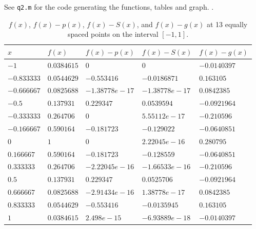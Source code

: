 \documentclass{article}
\begin{document}
\begin{enumerate}
See \texttt{q2.m} for the code generating the functions, tables and graph.
.
\begin{table}
	\centering
	\begin{tabular}{|l|l|l|l|l|}
	\hline
	$x$ & $f(x)$ & $f(x)-p(x)$ & $f(x)-S(x)$ & $f(x)-g(x)$ \\ \hline
	$        -1$ & $ 0.0384615$ & $         0$ & $         0$ & $-0.0140397$ \\
	$ -0.833333$ & $ 0.0544629$ & $ -0.553416$ & $-0.0186871$ & $  0.163105$ \\
	$ -0.666667$ & $ 0.0825688$ & $-1.38778e-17$ & $-1.38778e-17$ & $ 0.0842385$ \\
	$      -0.5$ & $  0.137931$ & $  0.229347$ & $ 0.0539594$ & $-0.0921964$ \\
	$ -0.333333$ & $  0.264706$ & $         0$ & $5.55112e-17$ & $ -0.210596$ \\
	$ -0.166667$ & $  0.590164$ & $ -0.181723$ & $ -0.129022$ & $-0.0640851$ \\
	$         0$ & $         1$ & $         0$ & $2.22045e-16$ & $  0.280795$ \\
	$  0.166667$ & $  0.590164$ & $ -0.181723$ & $ -0.128559$ & $-0.0640851$ \\
	$  0.333333$ & $  0.264706$ & $-2.22045e-16$ & $-1.66533e-16$ & $ -0.210596$ \\
	$       0.5$ & $  0.137931$ & $  0.229347$ & $ 0.0525706$ & $-0.0921964$ \\
	$  0.666667$ & $ 0.0825688$ & $-2.91434e-16$ & $1.38778e-17$ & $ 0.0842385$ \\
	$  0.833333$ & $ 0.0544629$ & $ -0.553416$ & $-0.0135945$ & $  0.163105$ \\
	$         1$ & $ 0.0384615$ & $ 2.498e-15$ & $-6.93889e-18$ & $-0.0140397$ \\
	\hline
	\end{tabular}
	\caption{$f(x)$, $f(x) - p(x)$, $f(x) - S(x)$, and $f(x) - g(x)$ at 13 equally spaced points on the interval $[-1,1]$.}
	\label{table:midway}
\end{table}


\end{enumerate}
\end{document}
